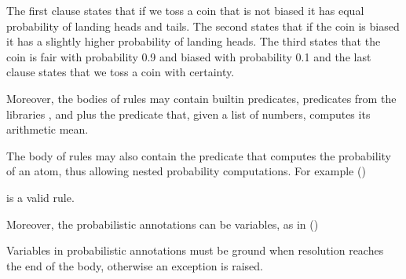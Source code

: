 \documentclass[letterpaper,10pt,english]{sphinxmanual}
\begin{document}
\sphinxAtStartPar
The first clause states that if we toss a coin that is not biased it has equal probability of landing heads and
tails.
The second states that if the coin is biased it has a slightly higher probability of landing heads.
The third states that the coin is fair with probability 0.9 and biased with probability 0.1 and the last clause
states that we toss a coin with certainty.

\sphinxAtStartPar
Moreover, the bodies of rules may contain built\sphinxhyphen{}in predicates, predicates from the libraries ,
 and  plus the predicate 
that, given a list of numbers, computes its arithmetic mean.

\sphinxAtStartPar
The body of rules may also contain the predicate  that computes the probability of an atom,
thus allowing nested probability computations.
For example ()

\begin{sphinxVerbatim}[commandchars=\\\{\}]
      
\end{sphinxVerbatim}

\sphinxAtStartPar
is a valid rule.

\sphinxAtStartPar
Moreover, the probabilistic annotations can be variables, as in ()

\begin{sphinxVerbatim}[commandchars=\\\{\}]

 
        
\end{sphinxVerbatim}

\sphinxAtStartPar
Variables in probabilistic annotations must be ground when resolution reaches the end of the body, otherwise an exception is raised.
\end{document}
